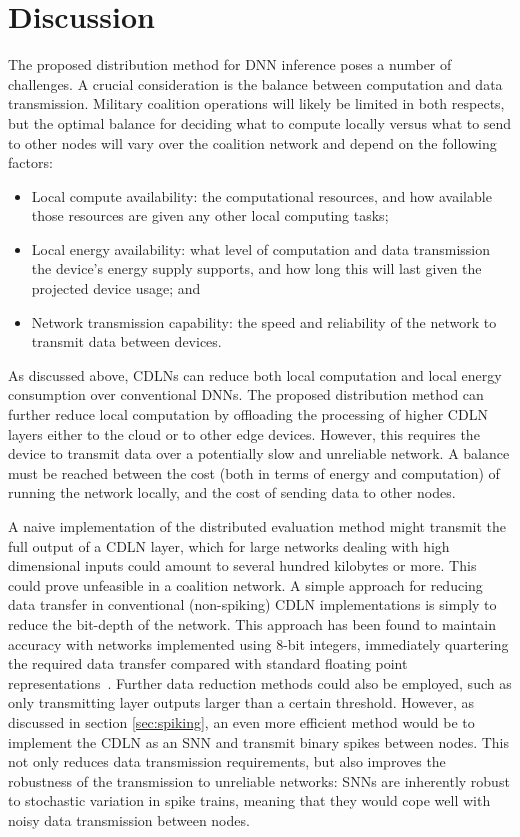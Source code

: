 \section{Discussion}
The proposed distribution method for DNN inference poses a number of challenges. A crucial consideration is the balance between computation and data transmission. Military coalition operations will likely be limited in both respects, but the optimal balance for deciding what to compute locally versus what to send to other nodes will vary over the coalition network and depend on the following factors:

\begin{itemize}
    \item Local compute availability: the computational resources, and how available those resources are given any other local computing tasks;
    \item Local energy availability: what level of computation and data transmission the device's energy supply supports, and how long this will last given the projected device usage; and
    \item Network transmission capability: the speed and reliability of the network to transmit data between devices.
\end{itemize}

As discussed above, CDLNs can reduce both local computation and local energy consumption over conventional DNNs. The proposed distribution method can further reduce local computation by offloading the processing of higher CDLN layers either to the cloud or to other edge devices. However, this requires the device to transmit data over a potentially slow and unreliable network. A balance must be reached between the cost (both in terms of energy and computation) of running the network locally, and the cost of sending data to other nodes.

A naive implementation of the distributed evaluation method might transmit the full output of a CDLN layer, which for large networks dealing with high dimensional inputs could amount to several hundred kilobytes or more. This could prove unfeasible in a coalition network. A simple approach for reducing data transfer in conventional (non-spiking) CDLN implementations is simply to reduce the bit-depth of the network. This approach has been found to maintain accuracy with networks implemented using 8-bit integers, immediately quartering the required data transfer compared with standard floating point representations~\cite{jacob2018quantization}. Further data reduction methods could also be employed, such as only transmitting layer outputs larger than a certain threshold. However, as discussed in section \ref{sec:spiking}, an even more efficient method would be to implement the CDLN as an SNN and transmit binary spikes between nodes. This not only reduces data transmission requirements, but also improves the robustness of the transmission to unreliable networks: SNNs are inherently robust to stochastic variation in spike trains, meaning that they would cope well with noisy data transmission between nodes.

